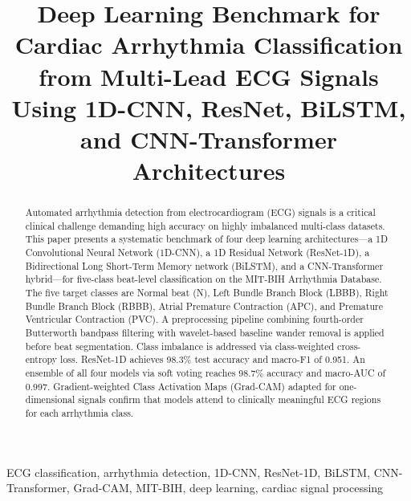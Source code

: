 \documentclass[conference]{IEEEtran}
\begin{document}
\title{Deep Learning Benchmark for Cardiac Arrhythmia Classification\\
from Multi-Lead ECG Signals Using 1D-CNN, ResNet, BiLSTM,\\
and CNN-Transformer Architectures
}

\author{
}

\maketitle

\begin{abstract}
Automated arrhythmia detection from electrocardiogram (ECG) signals is a critical clinical challenge demanding high accuracy on highly imbalanced multi-class datasets. This paper presents a systematic benchmark of four deep learning architectures---a 1D Convolutional Neural Network (1D-CNN), a 1D Residual Network (ResNet-1D), a Bidirectional Long Short-Term Memory network (BiLSTM), and a CNN-Transformer hybrid---for five-class beat-level classification on the MIT-BIH Arrhythmia Database. The five target classes are Normal beat (N), Left Bundle Branch Block (LBBB), Right Bundle Branch Block (RBBB), Atrial Premature Contraction (APC), and Premature Ventricular Contraction (PVC). A preprocessing pipeline combining fourth-order Butterworth bandpass filtering with wavelet-based baseline wander removal is applied before beat segmentation. Class imbalance is addressed via class-weighted cross-entropy loss. ResNet-1D achieves 98.3\% test accuracy and macro-F1 of 0.951. An ensemble of all four models via soft voting reaches 98.7\% accuracy and macro-AUC of 0.997. Gradient-weighted Class Activation Maps (Grad-CAM) adapted for one-dimensional signals confirm that models attend to clinically meaningful ECG regions for each arrhythmia class.
\end{abstract}

\begin{IEEEkeywords}
ECG classification, arrhythmia detection, 1D-CNN, ResNet-1D, BiLSTM, CNN-Transformer, Grad-CAM, MIT-BIH, deep learning, cardiac signal processing
\end{IEEEkeywords}

\end{document}
